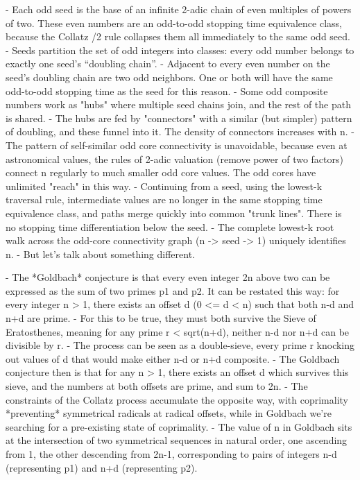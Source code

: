 \documentclass[12pt]{article}
\theoremstyle{plain}
\theoremstyle{definition}
\begin{document}
- Each odd seed is the base of an infinite 2-adic chain of even multiples of powers of two. These even numbers are an odd-to-odd stopping time equivalence class, because the Collatz /2 rule collapses them all immediately to the same odd seed.
- Seeds partition the set of odd integers into classes: every odd number belongs to exactly one seed’s “doubling chain”.
- Adjacent to every even number on the seed's doubling chain are two odd neighbors. One or both will have the same odd-to-odd stopping time as the seed for this reason.
- Some odd composite numbers work as "hubs" where multiple seed chains join, and the rest of the path is shared.
- The hubs are fed by "connectors" with a similar (but simpler) pattern of doubling, and these funnel into it. The density of connectors increases with n.
- The pattern of self-similar odd core connectivity is unavoidable, because even at astronomical values, the rules of 2-adic valuation (remove power of two factors) connect n regularly to much smaller odd core values. The odd cores have unlimited "reach" in this way.
- Continuing from a seed, using the lowest-k traversal rule, intermediate values are no longer in the same stopping time equivalence class, and paths merge quickly into common "trunk lines". There is no stopping time differentiation below the seed.
- The complete lowest-k root walk across the odd-core connectivity graph (n -> seed -> 1) uniquely identifies n.
- But let's talk about something different.

- The *Goldbach* conjecture is that every even integer 2n above two can be expressed as the sum of two primes p1 and p2. It can be restated this way: for every integer n > 1, there exists an offset d (0 <= d < n) such that both n-d and n+d are prime.
- For this to be true, they must both survive the Sieve of Eratosthenes, meaning for any prime r < sqrt(n+d), neither n-d nor n+d can be divisible by r.
- The process can be seen as a double-sieve, every prime r knocking out values of d that would make either n-d or n+d composite.
- The Goldbach conjecture then is that for any n > 1, there exists an offset d which survives this sieve, and the numbers at both offsets are prime, and sum to 2n.
- The constraints of the Collatz process accumulate the opposite way, with coprimality *preventing* symmetrical radicals at radical offsets, while in Goldbach we're searching for a pre-existing state of coprimality.
- The value of n in Goldbach sits at the intersection of two symmetrical sequences in natural order, one ascending from 1, the other descending from 2n-1, corresponding to pairs of integers n-d (representing p1) and n+d (representing p2). 
\end{document}
